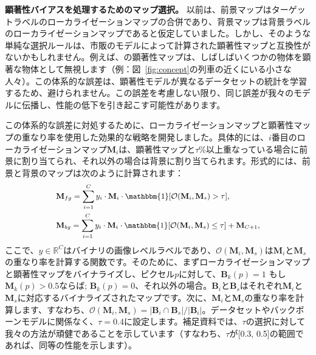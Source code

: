 \documentclass[final]{cvpr}
\begin{document}
\vspace{1mm}
\noindent\textbf{顕著性バイアスを処理するためのマップ選択。} 以前は、前景マップはターゲットラベルのローカライゼーションマップの合併であり、背景マップは背景ラベルのローカライゼーションマップであると仮定していました。しかし、そのような単純な選択ルールは、市販のモデルによって計算された顕著性マップと互換性がないかもしれません。例えば、\cite{zhao2019pyramid}の顕著性マップは、しばしばいくつかの物体を顕著な物体として無視します（例：図~\ref{fig:concept}の列車の近くにいる小さな人々）。この体系的な誤差は、顕著性モデルが異なるデータセットの統計を学習するため、避けられません。この誤差を考慮しない限り、同じ誤差が我々のモデルに伝播し、性能の低下を引き起こす可能性があります。

この体系的な誤差に対処するために、ローカライゼーションマップと顕著性マップの重なり率を使用した効果的な戦略を開発しました。具体的には、$i$番目のローカライゼーションマップ$\mathbf{M}_{i}$は、顕著性マップと$\tau$\%以上重なっている場合に前景に割り当てられ、それ以外の場合は背景に割り当てられます。形式的には、前景と背景のマップは次のように計算されます：\vspace{-1mm}
\begin{equation}
\label{eq_map_selection}
{\small
\begin{split}
&\mathbf{M}_{fg} = \sum_{i=1}^{C} {y_{i} \cdot \mathbf{M}_{i} \cdot \mathbbm{1}[\mathcal{O}(\mathbf{M}_i, \mathbf{M}_{s}) > \tau]}, \\
&\mathbf{M}_{bg} = \sum_{i=1}^{C} {y_{i} \cdot \mathbf{M}_{i} \cdot \mathbbm{1}[\mathcal{O}(\mathbf{M}_i, \mathbf{M}_{s}) \le \tau]} + \mathbf{M}_{C+1},
\end{split}}\vspace{-1mm}
\end{equation}
\noindent ここで、$y \in \mathbb{R}^C$はバイナリの画像レベルラベルであり、$\mathcal{O}(\mathbf{M}_i, \mathbf{M}_{s})$は$\mathbf{M}_i$と$\mathbf{M}_{s}$の重なり率を計算する関数です。そのために、まずローカライゼーションマップと顕著性マップをバイナライズし、ピクセル$p$に対して、$\mathbf{B}_{k}(p) = 1$ もし$\mathbf{M}_{k}(p) > 0.5$ならば; $\mathbf{B}_{k}(p) = 0$、それ以外の場合。$\mathbf{B}_{i}$と$\mathbf{B}_{s}$はそれぞれ$\mathbf{M}_i$と$\mathbf{M}_{s}$に対応するバイナライズされたマップです。次に、$\mathbf{M}_i$と$\mathbf{M}_{s}$の重なり率を計算します、すなわち、$\mathcal{O}(\mathbf{M}_i ,\mathbf{M}_{s}) = |\mathbf{B}_i \cap \mathbf{B}_{s}| / |\mathbf{B}_{i}|$。データセットやバックボーンモデルに関係なく、$\tau=0.4$に設定します。補足資料では、$\tau$の選択に対して我々の方法が頑健であることを示しています（すなわち、$\tau$が[0.3, 0.5]の範囲であれば、同等の性能を示します）。
\end{document}
